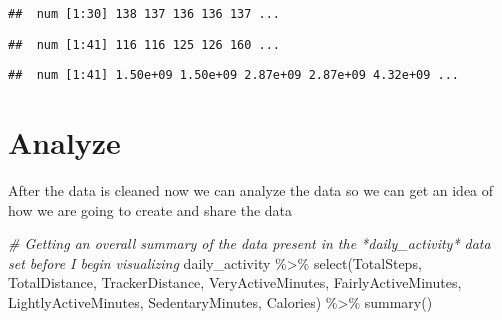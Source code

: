 \documentclass[
]{article}
\newenvironment{Shaded}{\begin{snugshade}}{\end{snugshade}}
\newcommand{\CommentTok}[1]{\textcolor[rgb]{0.56,0.35,0.01}{\textit{#1}}}
\newcommand{\FunctionTok}[1]{\textcolor[rgb]{0.00,0.00,0.00}{#1}}
\newcommand{\NormalTok}[1]{#1}
\newcommand{\SpecialCharTok}[1]{\textcolor[rgb]{0.00,0.00,0.00}{#1}}
\begin{document}
\begin{verbatim}
##  num [1:30] 138 137 136 136 137 ...
\end{verbatim}

\begin{Shaded}
\end{Shaded}

\begin{verbatim}
##  num [1:41] 116 116 125 126 160 ...
\end{verbatim}

\begin{Shaded}
\end{Shaded}

\begin{verbatim}
##  num [1:41] 1.50e+09 1.50e+09 2.87e+09 2.87e+09 4.32e+09 ...
\end{verbatim}

\hypertarget{analyze}{%
\section{\texorpdfstring{\textbf{Analyze}}{Analyze}}\label{analyze}}

After the data is cleaned now we can analyze the data so we can get an
idea of how we are going to create and share the data

\begin{Shaded}
\begin{Highlighting}[]
\CommentTok{\# Getting an overall summary of the data present in the *daily\_activity* data set before I begin visualizing }
\NormalTok{daily\_activity }\SpecialCharTok{\%\textgreater{}\%}
  \FunctionTok{select}\NormalTok{(TotalSteps,}
\NormalTok{         TotalDistance, TrackerDistance, VeryActiveMinutes, FairlyActiveMinutes, LightlyActiveMinutes, SedentaryMinutes, Calories) }\SpecialCharTok{\%\textgreater{}\%}
  \FunctionTok{summary}\NormalTok{()}
\end{Highlighting}
\end{Shaded}
\end{document}
